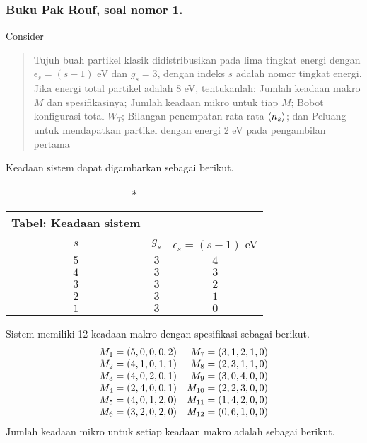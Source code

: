 \documentclass[../../../Main.tex]{subfiles}
\begin{document}
\subsubsection*{Buku Pak Rouf, soal nomor 1.} Consider 
\begin{quotation}
    Tujuh buah partikel klasik didistribusikan pada lima tingkat energi dengan $\epsilon_s = (s-1) $ eV dan $g_s =3$, dengan indeks $s$ adalah nomor tingkat energi. Jika energi total partikel adalah 8 eV, tentukanlah: Jumlah keadaan makro $M$ dan spesifikasinya; Jumlah keadaan mikro untuk tiap $M$; Bobot konfigurasi total $W_T$; Bilangan penempatan rata-rata $\braket{n_s}$; dan Peluang untuk mendapatkan partikel dengan energi 2 eV pada pengambilan pertama
\end{quotation}

Keadaan sistem dapat digambarkan sebagai berikut.
\begin{longtable}{c | c | c }
    \caption*{Tabel: Keadaan sistem}\\
    \hline
    $s$ & $g_s$& $\epsilon_s= (s-1)$ eV\\ 
    \hline\hline
    $5$& $3 $ & $4 $ \\ 
    $4$& $3 $ & $3 $ \\
    $3$& $3 $ & $2 $ \\
    $2$& $3 $ & $1 $\\
    $1$& $3 $ & $0 $\\
\end{longtable}
Sistem memiliki 12 keadaan makro dengan spesifikasi sebagai berikut.
\begin{equation*}
    \begin{array}{l r}
        M_1=(5,0,0,0,2)& M_7=(3,1,2,1,0)\\
        M_2=(4,1,0,1,1)& M_8=(2,3,1,1,0)\\
        M_3=(4,0,2,0,1)& M_9=(3,0,4,0,0)\\
        M_4=(2,4,0,0,1)& M_{10}=(2,2,3,0,0)\\
        M_5=(4,0,1,2,0)&M_{11}=(1,4,2,0,0)\\
        M_6=(3,2,0,2,0)&M_{12}=(0,6,1,0,0)\\
    \end{array}
\end{equation*}
Jumlah keadaan mikro untuk setiap keadaan makro adalah sebagai berikut.
\end{document}
